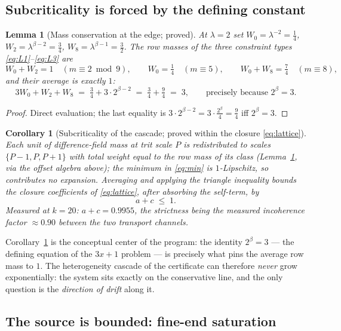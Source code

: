 \documentclass[11pt]{article}
\newtheorem{lemma}[theorem]{Lemma}
\newtheorem{corollary}[theorem]{Corollary}
\theoremstyle{definition}
\theoremstyle{remark}
\newcommand{\lam}{\lambda}
\newcommand{\bet}{\beta}
\begin{document}
\subsection{Subcriticality is forced by the defining constant}

\begin{lemma}[Mass conservation at the edge; proved]\label{lem:mass}
At $\lam = 2$ set $W_0 = \lam^{-2} = \tfrac14$,
$W_2 = \lam^{\bet-2} = \tfrac34$, $W_8 = \lam^{\bet-1} = \tfrac32$. The row
masses of the three constraint types \eqref{eq:L1}--\eqref{eq:L3} are
\[
W_0 + W_2 = 1 \quad (m \equiv 2 \bmod 9), \qquad
W_0 = \tfrac14 \quad (m \equiv 5), \qquad
W_0 + W_8 = \tfrac74 \quad (m \equiv 8),
\]
and their average is exactly $1$:
\[
3 W_0 + W_2 + W_8 \;=\; \tfrac34 + 3 \cdot 2^{\bet - 2} \;=\; \tfrac34 + \tfrac94 \;=\; 3,
\qquad\text{precisely because } 2^{\bet} = 3 .
\]
\end{lemma}

\begin{proof}
Direct evaluation; the last equality is $3 \cdot 2^{\bet-2} = 3 \cdot \frac{2^\bet}{4}
= \frac{9}{4}$ iff $2^\bet = 3$.
\end{proof}

\begin{corollary}[Subcriticality of the cascade; proved within the closure
\eqref{eq:lattice}]\label{cor:subcrit}
Each unit of difference-field mass at trit scale $P$ is redistributed to scales
$\{P-1, P, P+1\}$ with total weight equal to the row mass of its class
(Lemma~\ref{lem:mass}, via the offset algebra above); the minimum in
\eqref{eq:min} is $1$-Lipschitz, so contributes no expansion. Averaging and
applying the triangle inequality bounds the closure coefficients of
\eqref{eq:lattice}, after absorbing the self-term, by
\[
a + c \;\leq\; 1 .
\]
Measured at $k = 20$: $a + c = 0.9955$, the strictness being the measured
incoherence factor $\approx 0.90$ between the two transport channels.
\end{corollary}

Corollary~\ref{cor:subcrit} is the conceptual center of the program: the
identity $2^{\bet} = 3$ --- the defining equation of the $3x+1$ problem ---
is precisely what pins the average row mass to $1$. The heterogeneity cascade
of the certificate can therefore \emph{never} grow exponentially: the system
sits exactly on the conservative line, and the only question is the
\emph{direction of drift} along it.

\subsection{The source is bounded: fine-end saturation}
\end{document}
